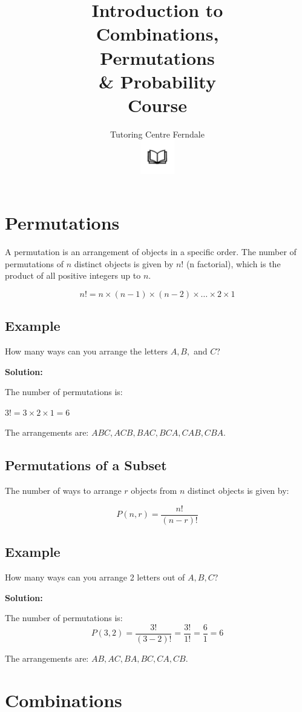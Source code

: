 \documentclass[12pt]{article}
\title{Introduction to\\Combinations,\\Permutations\\\& Probability\\Course}\\
\author{Tutoring Centre Ferndale\\
\includegraphics[width=4em]{ApS_logo.png}}
\date{}
\begin{document}
\maketitle

\section*{Permutations}

A permutation is an arrangement of objects in a specific order. The number of permutations of \( n \) distinct objects is given by \( n! \) (n factorial), which is the product of all positive integers up to \( n \).

\[
n! = n \times (n-1) \times (n-2) \times \ldots \times 2 \times 1
\]

\subsection*{Example}

How many ways can you arrange the letters \( A, B, \) and \( C \)?

\textbf{Solution:}

The number of permutations is:

$3! = 3 \times 2 \times 1 = 6$

The arrangements are: \( ABC, ACB, BAC, BCA, CAB, CBA \).

\subsection*{Permutations of a Subset}

The number of ways to arrange \( r \) objects from \( n \) distinct objects is given by:

\[P(n, r) = \frac{n!}{(n-r)!}\]

\subsection*{Example}

How many ways can you arrange 2 letters out of \( A, B, C \)?

\textbf{Solution:}

The number of permutations is:
\[P(3, 2) = \frac{3!}{(3-2)!} = \frac{3!}{1!} = \frac{6}{1} = 6\]

The arrangements are: \( AB, AC, BA, BC, CA, CB \).

\newpage

\section*{Combinations}
\end{document}
